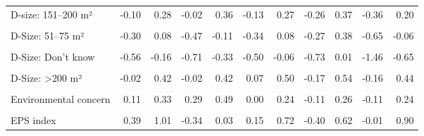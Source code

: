 \begin{table}
\begin{tabular}[t]{lrrrrrrrrrr}
D-size: 151–200 m² & -0.10 & 0.28 & -0.02 & 0.36 & -0.13 & 0.27 & -0.26 & 0.37 & -0.36 & 0.20\\
\cellcolor{gray!10}{D-Size: 26–50 m²} & \cellcolor{gray!10}{-0.34} & \cellcolor{gray!10}{0.14} & \cellcolor{gray!10}{-0.39} & \cellcolor{gray!10}{0.05} & \cellcolor{gray!10}{-0.29} & \cellcolor{gray!10}{0.26} & \cellcolor{gray!10}{-0.52} & \cellcolor{gray!10}{0.38} & \cellcolor{gray!10}{-0.86} & \cellcolor{gray!10}{-0.04}\\
D-Size: 51–75 m² & -0.30 & 0.08 & -0.47 & -0.11 & -0.34 & 0.08 & -0.27 & 0.38 & -0.65 & -0.06\\
\cellcolor{gray!10}{D-Size: 76–100 m²} & \cellcolor{gray!10}{-0.35} & \cellcolor{gray!10}{-0.02} & \cellcolor{gray!10}{-0.27} & \cellcolor{gray!10}{0.03} & \cellcolor{gray!10}{-0.30} & \cellcolor{gray!10}{0.06} & \cellcolor{gray!10}{-0.30} & \cellcolor{gray!10}{0.28} & \cellcolor{gray!10}{-0.42} & \cellcolor{gray!10}{0.07}\\
D-Size: Don't know & -0.56 & -0.16 & -0.71 & -0.33 & -0.50 & -0.06 & -0.73 & 0.01 & -1.46 & -0.65\\
\cellcolor{gray!10}{D-Size: <25 m²} & \cellcolor{gray!10}{-0.92} & \cellcolor{gray!10}{0.03} & \cellcolor{gray!10}{-1.54} & \cellcolor{gray!10}{-0.56} & \cellcolor{gray!10}{-1.01} & \cellcolor{gray!10}{0.10} & \cellcolor{gray!10}{-0.44} & \cellcolor{gray!10}{0.97} & \cellcolor{gray!10}{-1.28} & \cellcolor{gray!10}{0.17}\\
D-Size: >200 m² & -0.02 & 0.42 & -0.02 & 0.42 & 0.07 & 0.50 & -0.17 & 0.54 & -0.16 & 0.44\\
\cellcolor{gray!10}{D-Location: Rural} & \cellcolor{gray!10}{-0.01} & \cellcolor{gray!10}{0.23} & \cellcolor{gray!10}{-0.05} & \cellcolor{gray!10}{0.17} & \cellcolor{gray!10}{-0.04} & \cellcolor{gray!10}{0.22} & \cellcolor{gray!10}{-0.01} & \cellcolor{gray!10}{0.39} & \cellcolor{gray!10}{0.01} & \cellcolor{gray!10}{0.41}\\
Environmental concern & 0.11 & 0.33 & 0.29 & 0.49 & 0.00 & 0.24 & -0.11 & 0.26 & -0.11 & 0.24\\
\cellcolor{gray!10}{Government support} & \cellcolor{gray!10}{7.10} & \cellcolor{gray!10}{17.53} & \cellcolor{gray!10}{6.48} & \cellcolor{gray!10}{16.97} & \cellcolor{gray!10}{7.30} & \cellcolor{gray!10}{18.04} & \cellcolor{gray!10}{8.41} & \cellcolor{gray!10}{20.63} & \cellcolor{gray!10}{8.28} & \cellcolor{gray!10}{23.86}\\
EPS index & 0.39 & 1.01 & -0.34 & 0.03 & 0.15 & 0.72 & -0.40 & 0.62 & -0.01 & 0.90\\

\end{tabular}
\end{table}
